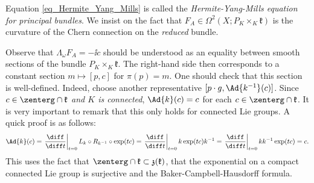 {
Equation \eqref{eq_Hermite_Yang_Mills} is called the \textit{Hermite-Yang-Mills equation for principal bundles}. We insist on the fact that \(F_A \in \Omega^2(X; P_K \times_K \mathfrak{k})\) is the curvature of the Chern connection on the \textit{reduced} bundle.
\begin{obs} \label{obs_HYM_center_Lie_algebra}
    Observe that \(\Lambda_\omega F_A=-\ii c\) should be understood as an equality between smooth sections of the bundle \(P_K \times _K \mathfrak{k}\). The right-hand side then corresponds to a constant section \(m \mapsto [p, c]\) for \(\pi(p)=m\). One should check that this section is well-defined. Indeed, choose another representative \([p\cdot g, \Ad{k^{-1}}(c)]\). Since \(c \in \zenterg\cap \mathfrak{k}\) \textit{and \(K\) is connected}, \(\Ad{k}(c)=c\) for each \(c \in \zenterg \cap \mathfrak{k}\). It is very important to remark that this only holds for connected Lie groups. A quick proof is as follows:
    \begin{align*}
        \Ad{k}(c) =\left.  \frac{\diff}{\diff t}\right|_{t=0} L_k \circ R_{k^{-1}} \circ \exp(tc) = \left.  \frac{\diff}{\diff t}\right|_{t=0}  k \exp(tc)k^{-1}=\left.  \frac{\diff}{\diff t}\right|_{t=0} kk^{-1}\exp(tc)=c.
    \end{align*}
    This uses the fact that \(\zenterg\cap\mathfrak{k}\subset \mathfrak{z}(\mathfrak{k})\), that the exponential on a compact connected Lie group is surjective \parencite[Cor. 12.2.3]{hilgert2011structure} and the Baker-Campbell-Hausdorff formula. \\


\end{obs}}

